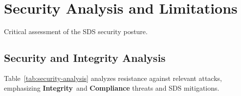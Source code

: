 \documentclass[12pt,a4paper]{report}
\newcommand{\Integrity}{\textbf{Integrity}}
\begin{document}
	\section{Security Analysis and Limitations} %
	\label{sec:4-7} %
	
	Critical assessment of the SDS security posture.
	
	\subsection{Security and Integrity Analysis} %
	\label{sec:4-7-1} %
	
	Table~\ref{tab:security-analysis} analyzes resistance against relevant attacks, emphasizing \Integrity\ and \textbf{Compliance} threats and SDS mitigations.
	
\end{document}
